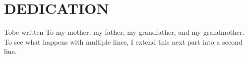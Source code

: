 %
%
%
%

\chapter*{DEDICATION}



\begin{center}
\vspace*{\fill}
Tobe written
To my mother, my father, my grandfather, and my grandmother. To see what happens with multiple lines, I extend this next part into a second line.
\vspace*{\fill}
\end{center}

\pagebreak{}
